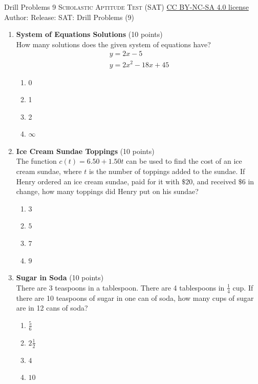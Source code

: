 \newpage\handout
{Drill Problems 9}
{\textsc{Scholastic Aptitude Test (SAT)}}
{\href{https://creativecommons.org/licenses/by-nc-sa/4.0/}{CC BY-NC-SA 4.0 license}}
{Author: \BookAuthor}{Release: \generatedOn}
{SAT: Drill Problems (9)}



\begin{enumerate}
  \item \textbf{System of Equations Solutions} (10 points)\\
  How many solutions does the given system of equations have?
  \[
    \begin{gathered}
    y = 2x - 5 \\
    y = 2x^2 - 18x + 45
    \end{gathered}
  \]
  \begin{enumerate}[label=\Alph*.]
    \item 0
    \item 1
    \item 2
    \item $\infty$
  \end{enumerate}
  \begin{subanswer}
  \end{subanswer}

  \item \textbf{Ice Cream Sundae Toppings} (10 points)\\
  The function $c(t) = 6.50 + 1.50t$ can be used to find the cost of an ice cream sundae, where $t$ is the number of toppings added to the sundae. If Henry ordered an ice cream sundae, paid for it with $\$20$, and received $\$6$ in change, how many toppings did Henry put on his sundae?
  \begin{enumerate}[label=\Alph*.]
    \item $3$
    \item $5$
    \item $7$
    \item $9$
  \end{enumerate}
  \begin{subanswer}
  \end{subanswer}

  \item \textbf{Sugar in Soda} (10 points)\\
  There are 3 teaspoons in a tablespoon. There are 4 tablespoons in $\frac{1}{4}$ cup. If there are 10 teaspoons of sugar in one can of soda, how many cups of sugar are in 12 cans of soda?
  \begin{enumerate}[label=\Alph*.]
    \item $\frac{5}{6}$
    \item $2 \frac{1}{2}$
    \item $4$
    \item $10$
  \end{enumerate}
  \begin{subanswer}
  \end{subanswer}


\end{enumerate}
